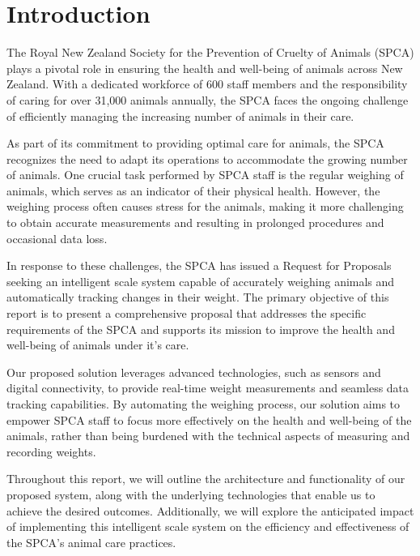 
\chapter{Introduction}

The Royal New Zealand Society for the Prevention of Cruelty of Animals (SPCA) plays a pivotal role in ensuring the health and well-being of animals across New Zealand. With a dedicated workforce of 600 staff members and the responsibility of caring for over 31,000 animals annually, the SPCA faces the ongoing challenge of efficiently managing the increasing number of animals in their care.

As part of its commitment to providing optimal care for animals, the SPCA recognizes the need to adapt its operations to accommodate the growing number of animals. One crucial task performed by SPCA staff is the regular weighing of animals, which serves as an indicator of their physical health. However, the weighing process often causes stress for the animals, making it more challenging to obtain accurate measurements and resulting in prolonged procedures and occasional data loss. 

In response to these challenges, the SPCA has issued a Request for Proposals seeking an intelligent scale system capable of accurately weighing animals and automatically tracking changes in their weight. The primary objective of this report is to present a comprehensive proposal that addresses the specific requirements of the SPCA and supports its mission to improve the health and well-being of animals under it's care. 

Our proposed solution leverages advanced technologies, such as sensors and digital connectivity, to provide real-time weight measurements and seamless data tracking capabilities. By automating the weighing process, our solution aims to empower SPCA staff to focus more effectively on the health and well-being of the animals, rather than being burdened with the technical aspects of measuring and recording weights. 

Throughout this report, we will outline the architecture and functionality of our proposed system, along with the underlying technologies that enable us to achieve the desired outcomes. Additionally, we will explore the anticipated impact of implementing this intelligent scale system on the efficiency and effectiveness of the SPCA’s animal care practices. 

